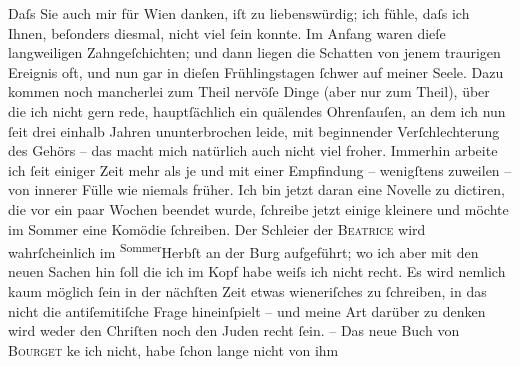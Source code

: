 \pstart
           Daſs Sie auch mir für Wien danken, iſt zu
               liebenswürdig; ich fühle, daſs ich Ihnen, beſonders diesmal, nicht viel{ }ſein konnte.
               Im Anfang waren dieſe langweiligen Zahngeſchichten; und dann liegen die Schatten von
               jenem traurigen Ereignis oft, und nun gar in dieſen Frühlingstagen{ }ſchwer auf meiner
               Seele. Dazu kommen noch mancherlei zum {\pb}Theil
               nervöſe Dinge (aber nur zum Theil), über die ich nicht gern rede, hauptſächlich ein
               quälendes Ohrenſauſen, an dem ich nun{ }ſeit drei einhalb Jahren ununterbrochen leide,
               mit beginnender Verſchlechterung des Gehörs – das macht mich natürlich auch nicht
               viel froher. Immerhin arbeite ich{ }ſeit einiger Zeit mehr als je und mit einer
               Empfindung – wenigſtens zuweilen – von innerer Fülle wie niemals früher. Ich bin
               jetzt daran eine Novelle zu
               dictiren, die vor ein paar Wochen beendet wurde,{ }ſchreibe jetzt einige {\pb}kleinere und möchte im Sommer eine Komödie{ }ſchreiben. Der Schleier der \textsc{Beatrice} wird wahrſcheinlich im \substVorne{}\textsuperscript{Sommer}\substDazwischen{}Herbſt\substHinten{} an der Burg aufgeführt; wo ich aber mit
               den neuen Sachen hin{ }ſoll die ich im Kopf habe weiſs ich nicht recht. Es wird nemlich
               kaum möglich{ }ſein in der nächſten Zeit etwas wieneriſches zu{ }ſchreiben, in das nicht die antiſemitiſche Frage hineinſpielt –
               und meine Art darüber zu denken wird weder den Chriſten noch den Juden recht{ }ſein. –
               Das neue Buch von \textsc{Bour{\pb}get} ke{\geminationn} ich nicht, habe{ }ſchon lange nicht von ihm
